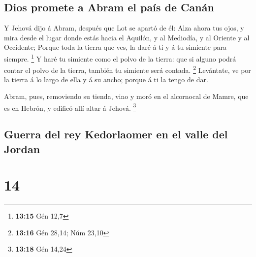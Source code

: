 \hypertarget{dios-promete-a-abram-el-pauxeds-de-canuxe1n}{%
\subsection{Dios promete a Abram el país de
Canán}\label{dios-promete-a-abram-el-pauxeds-de-canuxe1n}}

 Y Jehová dijo á Abram, después que Lot se apartó de él:
Alza ahora tus ojos, y mira desde el lugar donde estás hacia el Aquilón,
y al Mediodía, y al Oriente y al Occidente;  Porque toda la
tierra que ves, la daré á ti y á tu simiente para siempre. \footnote{\textbf{13:15}
  Gén 12,7}  Y haré tu simiente como el polvo de la tierra:
que si alguno podrá contar el polvo de la tierra, también tu simiente
será contada. \footnote{\textbf{13:16} Gén 28,14; Núm 23,10}
 Levántate, ve por la tierra á lo largo de ella y á su
ancho; porque á ti la tengo de dar.

 Abram, pues, removiendo su tienda, vino y moró en el
alcornocal de Mamre, que es en Hebrón, y edificó allí altar á Jehová.
\footnote{\textbf{13:18} Gén 14,24}

\hypertarget{guerra-del-rey-kedorlaomer-en-el-valle-del-jordan}{%
\subsection{Guerra del rey Kedorlaomer en el valle del
Jordan}\label{guerra-del-rey-kedorlaomer-en-el-valle-del-jordan}}

\hypertarget{section-13}{%
\section{14}\label{section-13}}

